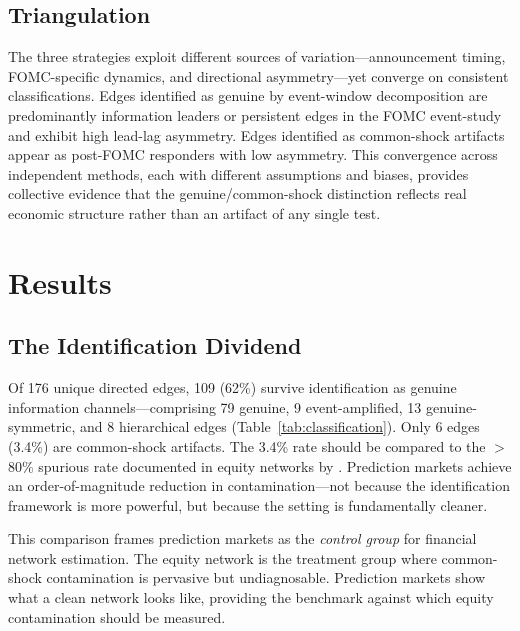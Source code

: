 \documentclass[12pt,letterpaper]{article}
\begin{document}
\subsection{Triangulation}

The three strategies exploit different sources of variation---announcement timing, FOMC-specific dynamics, and directional asymmetry---yet converge on consistent classifications. Edges identified as genuine by event-window decomposition are predominantly information leaders or persistent edges in the FOMC event-study and exhibit high lead-lag asymmetry. Edges identified as common-shock artifacts appear as post-FOMC responders with low asymmetry. This convergence across independent methods, each with different assumptions and biases, provides collective evidence that the genuine/common-shock distinction reflects real economic structure rather than an artifact of any single test.


\section{Results}\label{sec:results}

\subsection{The Identification Dividend}

Of 176 unique directed edges, 109 (62\%) survive identification as genuine information channels---comprising 79 genuine, 9 event-amplified, 13 genuine-symmetric, and 8 hierarchical edges (Table~\ref{tab:classification}). Only 6 edges (3.4\%) are common-shock artifacts. The 3.4\% rate should be compared to the $>$80\% spurious rate documented in equity networks by \citet{yang2026te}. Prediction markets achieve an order-of-magnitude reduction in contamination---not because the identification framework is more powerful, but because the setting is fundamentally cleaner.

This comparison frames prediction markets as the \textit{control group} for financial network estimation. The equity network is the treatment group where common-shock contamination is pervasive but undiagnosable. Prediction markets show what a clean network looks like, providing the benchmark against which equity contamination should be measured.
\end{document}
